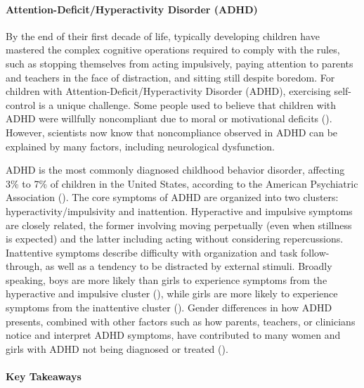 \documentclass[
]{krantz}
\begin{document}
\paragraph*{Attention-Deficit/Hyperactivity Disorder (ADHD)}\label{attention-deficithyperactivity-disorder-adhd}

By the end of their first decade of life, typically developing children have mastered the complex cognitive operations required to comply with the rules, such as stopping themselves from acting impulsively, paying attention to parents and teachers in the face of distraction, and sitting still despite boredom. For children with Attention-Deficit/Hyperactivity Disorder (ADHD), exercising self-control is a unique challenge. Some people used to believe that children with ADHD were willfully noncompliant due to moral or motivational deficits (). However, scientists now know that noncompliance observed in ADHD can be explained by many factors, including neurological dysfunction.

ADHD is the most commonly diagnosed childhood behavior disorder, affecting 3\% to 7\% of children in the United States, according to the American Psychiatric Association (). The core symptoms of ADHD are organized into two clusters: hyperactivity/impulsivity and inattention. Hyperactive and impulsive symptoms are closely related, the former involving moving perpetually (even when stillness is expected) and the latter including acting without considering repercussions. Inattentive symptoms describe difficulty with organization and task follow-through, as well as a tendency to be distracted by external stimuli. Broadly speaking, boys are more likely than girls to experience symptoms from the hyperactive and impulsive cluster (), while girls are more likely to experience symptoms from the inattentive cluster (). Gender differences in how ADHD presents, combined with other factors such as how parents, teachers, or clinicians notice and interpret ADHD symptoms, have contributed to many women and girls with ADHD not being diagnosed or treated ().

\paragraph*{Key Takeaways}\label{key-takeaways-2}
\end{document}
